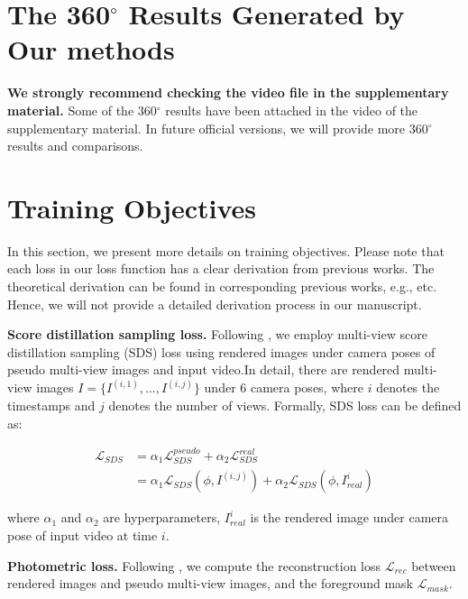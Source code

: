 \clearpage
\setcounter{page}{1}
\maketitlesupplementary




\section{The 360$^\circ$ Results Generated by Our methods}

\textbf{We strongly recommend checking the video file in the supplementary material.} Some of the 360$^\circ$ results have been attached in the video of the supplementary material. In future official versions, we will provide more 360$^\circ$ results and comparisons.


\section{Training Objectives}
In this section, we present more details on training objectives. Please note that each loss in our loss function has a clear derivation from previous works. The theoretical derivation can be found in corresponding previous works, e.g., \cite{zhang2018unreasonable,tang2023dreamgaussian,zeng2024stag4d} etc. Hence, we will not provide a detailed derivation process in our manuscript.

\textbf{Score distillation sampling loss.} Following \cite{zeng2024stag4d}, we employ multi-view score distillation sampling (SDS) loss using rendered images under camera poses of pseudo multi-view images and input video.In detail, there are rendered multi-view images $I=\{I^{(i,1)},\dots,I^{(i,j)}\}$ under 6 camera poses, where $i$ denotes the timestamps and $j$ denotes the number of views. Formally, SDS loss can be defined as:

\begin{equation}
\begin{aligned}
      \mathcal{L}_{SDS} &=\alpha_1\mathcal{L}_{SDS}^{pseudo}+\alpha_2\mathcal{L}_{SDS}^{real}\\&=\alpha_1\mathcal{L}_{SDS}(\phi,I^{(i,j)})+\alpha_2\mathcal{L}_{SDS}(\phi,I_{real}^{i})  
\end{aligned}
\end{equation}

where $\alpha_1$ and $\alpha_2$ are hyperparameters, $I_{real}^{i}$ is the rendered image under camera pose of input video at time $i$. 

\textbf{Photometric loss.} Following \cite{tang2023dreamgaussian,zeng2024stag4d}, we compute the reconstruction loss $\mathcal{L}_{rec}$ between rendered images and pseudo multi-view images, and the foreground mask $\mathcal{L}_{mask}$.

